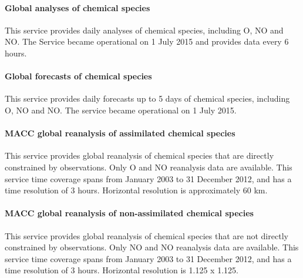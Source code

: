\documentclass[9pt]{report}
\begin{document}
\paragraph{Global analyses of chemical species}\label{sec-global-analyses-of-chemical-species}%

\noindent{}This service provides daily analyses of chemical species, including O, NO and NO. 
The Service became operational on 1 July 2015 and provides data every 6 hours.%

\paragraph{Global forecasts of chemical species}\label{sec-global-forecasts-of-chemical-species}%

\noindent{}This service provides daily forecasts up to 5 days of chemical species, including O, NO and NO. 
The service became operational on 1 July 2015.%

\paragraph{MACC global reanalysis of assimilated chemical species}\label{sec-macc-global-reanalysis-of-assimilated-chemical-species}%

\noindent{}This service provides global reanalysis of chemical species that are directly constrained by observations.
Only O and NO reanalysis data are available. 
This service time coverage spans from January 2003 to 31 December 2012, and has a time resolution of 3 hours.
Horizontal resolution is approximately 60 km.%

\paragraph{MACC global reanalysis of non-assimilated chemical species}\label{sec-macc-global-reanalysis-of-non-assimilated-chemical-species}%

\noindent{}This service provides global reanalysis of chemical species that are not directly constrained by observations. 
Only NO and NO reanalysis data are available. 
This service time coverage spans from January 2003 to 31 December 2012, and has a time resolution of 3 hours.
Horizontal resolution is 1.125\textdegree{} x 1.125\textdegree{}.%
\end{document}
